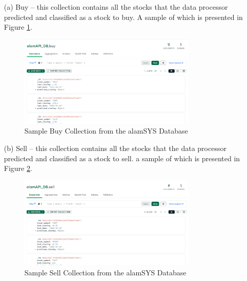 \begin{itemize}
    \item[(a)] Buy – this collection contains all the stocks that the 
    data processor predicted and classified as a stock to buy. A sample
    of which is presented in Figure \ref{fig:odm_buy_sample}.
    \begin{figure}[ht]
        \centering
        \includegraphics[width=0.80\textwidth]{./assets/Chapter_3/ODM/ODM_Buy_Sample.png}
        \caption{Sample Buy Collection from the alamSYS Database}
        \label{fig:odm_buy_sample}
    \end{figure}
    \FloatBarrier

    \item[(b)] Sell – this collection contains all the stocks that the
    data processor predicted and classified as a stock to sell. a
    sample of which is presented in Figure \ref{fig:odm_sell_sample}.
    \begin{figure}[ht]
        \centering
        \includegraphics[width=0.80\textwidth]{./assets/Chapter_3/ODM/ODM_Sell_Sample.png}
        \caption{Sample Sell Collection from the alamSYS Database}
        \label{fig:odm_sell_sample}
    \end{figure}
    \FloatBarrier


\end{itemize}
